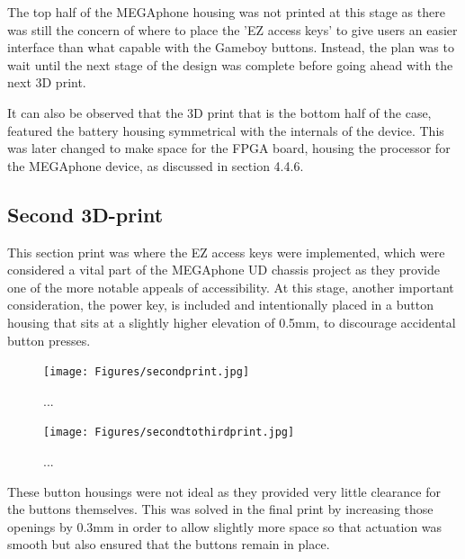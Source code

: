 The top half of the MEGAphone housing was not printed at this stage as there was still the concern of where to place the 'EZ access keys' to give users an easier interface than what capable with the Gameboy buttons.
Instead, the plan was to wait until the next stage of the design was complete before going ahead with the next 3D print.

It can also be observed that the 3D print that is the bottom half of the case, featured the battery housing symmetrical with the internals of the device.
This was later changed to make space for the FPGA board, housing the processor for the MEGAphone device, as discussed in section 4.4.6.

\subsection{Second 3D-print}

This section print was where the EZ access keys were implemented, which were considered a vital part of the MEGAphone UD chassis project as they provide one of the more notable appeals of accessibility.
At this stage, another important consideration, the power key, is included and intentionally placed in a button housing that sits at a slightly higher elevation of 0.5mm, to discourage accidental button presses.

\begin{figure} [h]
    \centering
    \texttt{[image: Figures/secondprint.jpg]}
    \caption{...}
    \label{fig:Second}
\end{figure}

\begin{figure} [h]
    \centering
    \texttt{[image: Figures/secondtothirdprint.jpg]}
    \caption{...}
    \label{fig:Secondtothird}
\end{figure}

These button housings were not ideal as they provided very little clearance for the buttons themselves.
This was solved in the final print by increasing those openings by 0.3mm in order to allow slightly more space so that actuation was smooth but also ensured that the buttons remain in place.

